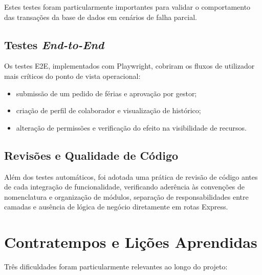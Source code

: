 \documentclass[12pt, a4paper, twoside, openright]{report}
\begin{document}
Estes testes foram particularmente importantes para validar o comportamento
das transações da base de dados em cenários de falha parcial.

\subsection{Testes \textit{End-to-End}}

Os testes E2E, implementados com Playwright, cobriram os fluxos de utilizador
mais críticos do ponto de vista operacional:

\begin{itemize}
  \item submissão de um pedido de férias e aprovação por gestor;
  \item criação de perfil de colaborador e visualização de histórico;
  \item alteração de permissões e verificação do efeito na visibilidade de recursos.
\end{itemize}

\subsection{Revisões e Qualidade de Código}

Além dos testes automáticos, foi adotada uma prática de revisão de código antes de
cada integração de funcionalidade, verificando aderência às convenções de nomenclatura
e organização de módulos, separação de responsabilidades entre camadas e ausência
de lógica de negócio diretamente em rotas Express.

\section{Contratempos e Lições Aprendidas}

Três dificuldades foram particularmente relevantes ao longo do projeto:
\end{document}

